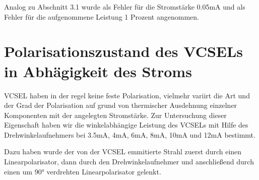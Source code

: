\documentclass[bigchapter,colorback,accentcolor=tud4b,linedtoc,11pt]{tudreport}
\begin{document}
\begin{center}
\begin{figure}[h]
\end{figure}
\end{center}

Analog zu Abschnitt 3.1 wurde als Fehler für die Stromstärke 0.05mA und als Fehler für die aufgenommene Leistung 1 Prozent angenommen.

\section{Polarisationszustand des VCSELs in Abhägigkeit des Stroms}
VCSEL haben in der regel keine feste Polarisation, vielmehr variirt die Art und der Grad der Polarisation auf grund von thermischer Ausdehnung einzelner Komponenten mit der angelegten Stromstärke. Zur Untersuchung dieser Eigenschaft haben wir die winkelabhängige Leistung des VCSELs mit Hilfe des Drehwinkelaufnehmers bei 3.5mA, 4mA, 6mA, 8mA, 10mA und 12mA bestimmt.

Dazu haben wurde der von der VCSEL emmitierte Strahl zuerst durch einen Linearpolarisator, dann durch den Drehwinkelaufnehmer und anschließend durch einen um 90° verdrehten Linearpolarisator gelenkt.
\end{document}
